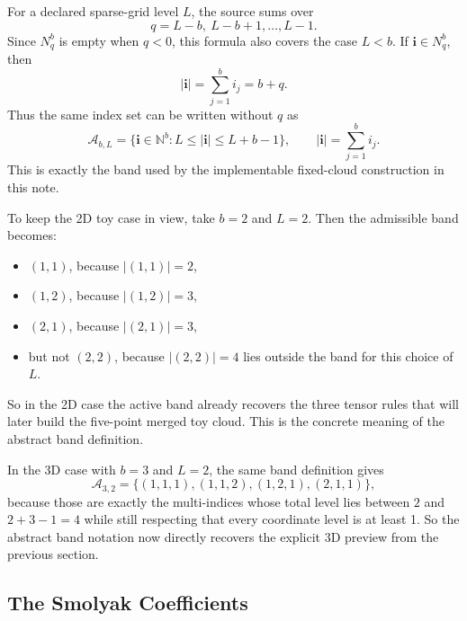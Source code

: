 \documentclass[11pt]{article}
\numberwithin{equation}{section}
\begin{document}
For a declared sparse-grid level \(L\), the source sums over
\[
  q=L-b,\ L-b+1,\ldots,L-1.
\]
Since \(N_q^b\) is empty when \(q<0\), this formula also covers the case
\(L<b\).  If \(\mathbf i\in N_q^b\), then
\begin{equation}
  |\mathbf i|=\sum_{j=1}^b i_j=b+q.
  \label{eq:p32-index-sum-q}
\end{equation}
Thus the same index set can be written without \(q\) as
\begin{equation}
  \mathcal A_{b,L}
  =
  \{\mathbf i\in\mathbb N^b: L\le |\mathbf i|\le L+b-1\},
  \qquad |\mathbf i|=\sum_{j=1}^b i_j.
  \label{eq:p31-level-band}
\end{equation}
This is exactly the band used by the implementable fixed-cloud construction in
this note.

To keep the 2D toy case in view, take \(b=2\) and \(L=2\).  Then the admissible
band becomes:
\begin{itemize}[leftmargin=0.28in]
  \item \((1,1)\), because \(|(1,1)|=2\),
  \item \((1,2)\), because \(|(1,2)|=3\),
  \item \((2,1)\), because \(|(2,1)|=3\),
  \item but not \((2,2)\), because \(|(2,2)|=4\) lies outside the band for this
  choice of \(L\).
\end{itemize}
So in the 2D case the active band already recovers the three tensor rules that
will later build the five-point merged toy cloud.  This is the concrete meaning
of the abstract band definition.

In the 3D case with \(b=3\) and \(L=2\), the same band definition gives
\begin{equation}
  \mathcal A_{3,2}
  =
  \{(1,1,1),(1,1,2),(1,2,1),(2,1,1)\},
  \label{eq:p38-A32}
\end{equation}
because those are exactly the multi-indices whose total level lies between
\(2\) and \(2+3-1=4\) while still respecting that every coordinate level is at
least 1.  So the abstract band notation now directly recovers the explicit 3D
preview from the previous section.

\subsection{The Smolyak Coefficients}
\label{subsec:p32-smolyak-coefficients}
\end{document}

